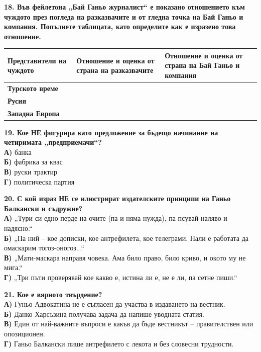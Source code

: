 \documentclass[12pt,a4paper]{article}
\begin{document}
{{{{{{{{{{{{\vspace{0.6cm}

\noindent
\textbf{18. Във фейлетона „Бай Ганьо журналист“ е показано отношението към чуждото през погледа на разказвачите и от гледна точка на Бай Ганьо и компания. Попълнете таблицата, като определите как е изразено това отношение.}

\vspace{0.3cm}

\noindent
\begin{tabularx}{\linewidth}{|>{\bfseries}X|X|X|}
\hline
Представители на чуждото & Отношение и оценка от страна на разказвачите & Отношение и оценка от страна на Бай Ганьо и компания \\
\hline
Турското време & & \\[1.5cm]
\hline
Русия & & \\[1.5cm]
\hline
Западна Европа & & \\[1.5cm]
\hline
\end{tabularx}

\vspace{0.6cm}

\noindent
\textbf{19. Кое НЕ фигурира като предложение за бъдещо начинание на четиримата „предприемачи“?} \\
\textbf{А)} банка \\
\textbf{Б)} фабрика за квас \\
\textbf{В)} руски трактир \\
\textbf{Г)} политическа партия

\vspace{0.6cm}

\noindent
\textbf{20. С кой израз НЕ се илюстрират издателските принципи на Ганьо Балкански и съдружие?} \\
\textbf{А)} „Тури си едно перде на очите (па и няма нужда), па псувай наляво и надясно.“ \\
\textbf{Б)} „Па ний – кое дописки, кое антрефилета, кое телеграми. Нали е работата да омаскарим тогоз-оногоз...“ \\
\textbf{В)} „Мати-маскара направя човека. Ама било право, било криво, и окото му не мига.“ \\
\textbf{Г)} „Три пъти проверявай кое какво е, истина ли е, не е ли, па сетне пиши.“

\vspace{0.6cm}

\noindent
\textbf{21. Кое е вярното твърдение?} \\
\textbf{А)} Гуньо Адвокатина не е съгласен да участва в издаването на вестник. \\
\textbf{Б)} Данко Харсъзина получава задача да напише уводната статия. \\
\textbf{В)} Един от най-важните въпроси е какъв да бъде вестникът – правителствен или опозиционен. \\
\textbf{Г)} Ганьо Балкански пише антрефилето с лекота и без словесни трудности.

}}}}}}}}}}}}
\end{document}
